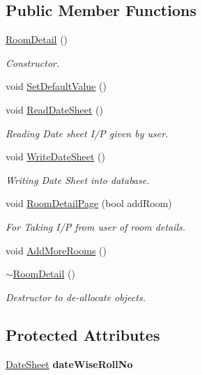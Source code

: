 \subsection*{\-Public \-Member \-Functions}
\begin{DoxyCompactItemize}
\item 
\hyperlink{classRoomDetail_acbbb21580bc1591daf23e614011acc06}{\-Room\-Detail} ()
\begin{DoxyCompactList}\small\item\em \-Constructor. \end{DoxyCompactList}\item 
void \hyperlink{classRoomDetail_a117bed37b0f95b364b7133fe13afa9b7}{\-Set\-Default\-Value} ()
\item 
void \hyperlink{classRoomDetail_ab8a07fd05ab314e85b374191e38e8556}{\-Read\-Date\-Sheet} ()
\begin{DoxyCompactList}\small\item\em \-Reading \-Date sheet \-I/\-P given by user. \end{DoxyCompactList}\item 
void \hyperlink{classRoomDetail_a90d4fc5bf3497068efecb5c9ec13e887}{\-Write\-Date\-Sheet} ()
\begin{DoxyCompactList}\small\item\em \-Writing \-Date \-Sheet into database. \end{DoxyCompactList}\item 
void \hyperlink{classRoomDetail_ab2c0a691ce4dea82d16f991c66021931}{\-Room\-Detail\-Page} (bool add\-Room)
\begin{DoxyCompactList}\small\item\em \-For \-Taking \-I/\-P from user of room details. \end{DoxyCompactList}\item 
void \hyperlink{classRoomDetail_ac4d4701717acda86a95c68ef5abbab28}{\-Add\-More\-Rooms} ()
\item 
\hyperlink{classRoomDetail_ae65b9b167e75a7dc994c4e2021937c68}{$\sim$\-Room\-Detail} ()
\begin{DoxyCompactList}\small\item\em \-Destructor to de-\/allocate objects. \end{DoxyCompactList}\end{DoxyCompactItemize}
\subsection*{\-Protected \-Attributes}
\begin{DoxyCompactItemize}
\item 
\hypertarget{classRoomDetail_a9bb16ea944d271f428cb36617c051ecd}{\hyperlink{classDateSheet}{\-Date\-Sheet} {\bfseries date\-Wise\-Roll\-No}}\label{d4/de5/classRoomDetail_a9bb16ea944d271f428cb36617c051ecd}

\end{DoxyCompactItemize}


